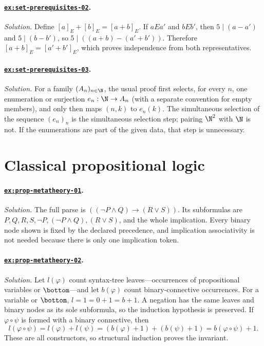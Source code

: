 \paragraph{\hyperref[ex:set-prerequisites-02]{\texttt{ex:set-prerequisites-02}}.}
\textit{Solution.}  Define \([a]_E+[b]_E=[a+b]_E\).  If
\(aE a'\) and \(bE b'\), then \(5\mid(a-a')\) and \(5\mid(b-b')\), so
\(5\mid((a+b)-(a'+b'))\).  Therefore \([a+b]_E=[a'+b']_E\), which proves
independence from both representatives.

\paragraph{\hyperref[ex:set-prerequisites-03]{\texttt{ex:set-prerequisites-03}}.}
\textit{Solution.}  For a family \((A_n)_{n\in\N}\), the usual proof first
selects, for every \(n\), one enumeration or surjection
\(e_n:\N\to A_n\) (with a separate convention for empty members), and only
then maps \((n,k)\) to \(e_n(k)\).  The simultaneous selection of the sequence
\((e_n)_n\) is the simultaneous selection step; pairing \(\N^2\) with \(\N\) is not.  If the
enumerations are part of the given data, that step is unnecessary.

\section{Classical propositional logic}

\paragraph{\hyperref[ex:prop-metatheory-01]{\texttt{ex:prop-metatheory-01}}.}
\textit{Solution.}  The full parse is
\(((\neg P\land Q)\to(R\lor S))\).  Its subformulas are
\(P,Q,R,S,\neg P,(\neg P\land Q),(R\lor S)\), and the whole implication.
Every binary node shown is fixed by the declared precedence, and implication
associativity is not needed because there is only one implication token.

\paragraph{\hyperref[ex:prop-metatheory-02]{\texttt{ex:prop-metatheory-02}}.}
\textit{Solution.}  Let \(l(\varphi)\) count syntax-tree leaves---occurrences
of propositional variables or \(\bottom\)---and let \(b(\varphi)\) count
binary-connective occurrences.  For a variable or \(\bottom\),
\(l=1=0+1=b+1\).  A negation has the same leaves and binary nodes as its sole
subformula, so the induction hypothesis is preserved.  If
\(\varphi\circ\psi\) is formed with a binary connective, then
\[
l(\varphi\circ\psi)=l(\varphi)+l(\psi)
=(b(\varphi)+1)+(b(\psi)+1)
=b(\varphi\circ\psi)+1.
\]
These are all constructors, so structural induction proves the invariant.

